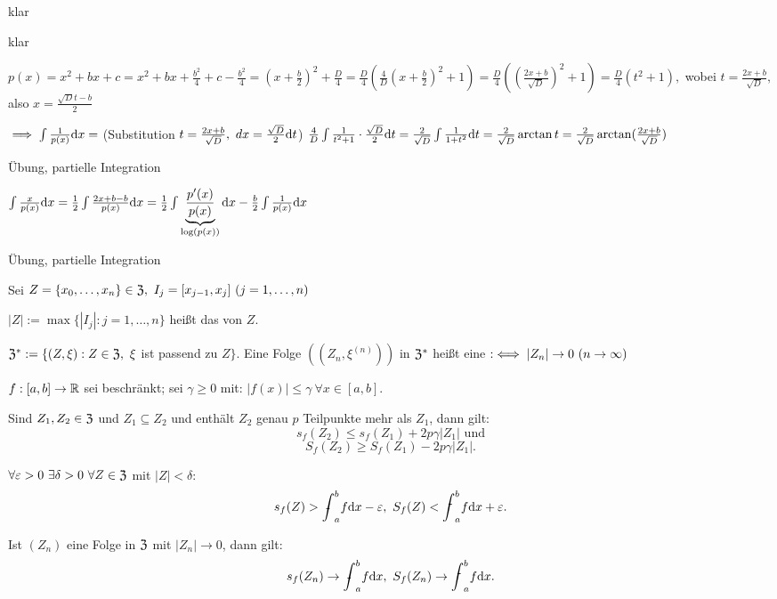 \documentclass[a4paper,oneside,DIV15,BCOR12mm]{scrbook}
\begin{document}
\begin{beweise}
\item klar
\item klar
\item  $p(x) = x^2+bx+c = x^2+bx+\frac{b^2}{4} + c - \frac{b^2}{4} = (x+\frac{b}{2})^2 + \frac{D}{4} = \frac{D}{4}(\frac{4}{D}(x+\frac{b}{2})^2 + 1) = \frac{D}{4}((\frac{2x+b}{\sqrt{D}})^2 + 1)= \frac{D}{4}(t^2+1),$ wobei $t = \frac{2x+b}{\sqrt{D}},$ also $x = \frac{\sqrt{D}t - b}{2}$

$\implies \int\frac{1}{p(x)}\text{d}x =$ (Substitution $t=\frac{2x+b}{\sqrt{D}},\  dx=\frac{\sqrt{D}}{2}\text{d}t$) $\frac{4}{D} \int\frac{1}{t^2+1} \cdot \frac{\sqrt{D}}{2}\text{d}t = \frac{2}{\sqrt{D}} \int\frac{1}{1+t^2}\text{d}t = \frac{2}{\sqrt{D}} \arctan t = \frac{2}{\sqrt{D}} \arctan(\frac{2x+b}{\sqrt{D}})$

\item Übung, partielle Integration
\item $\int\frac{x}{p(x)}\text{d}x = \frac{1}{2} \int\frac{2x+b-b}{p(x)}\text{d}x = \frac{1}{2}\int \underbrace{\frac{p'(x)}{p(x)}}_{\log(p(x))}\text{d}x - \frac{b}{2} \int\frac{1}{p(x)}\text{d}x$

\item Übung, partielle Integration
\end{beweise}

\begin{definition}
\begin{liste}
\item Sei $Z = \{x_0,\ldots,x_n\} \in \mathfrak{Z},\ I_j = [x_{j-1},x_j]\ (j=1,\ldots,n)$

$|Z| := \max \{|I_j| : j=1,\ldots,n\}$ heißt das  von $Z$.

\item $\mathfrak{Z}^* := \{(Z,\xi) : Z \in \mathfrak{Z},\ \xi$ ist passend zu $Z \}$. Eine Folge $((Z_n,\xi^{(n)}))$ in $\mathfrak{Z}^*$ heißt eine  $:\iff |Z_n| \to 0\ (n \to \infty)$
\end{liste}
\end{definition}

\begin{satz}
$f: [a,b] \to \mathbb{R}$ sei beschränkt; sei $\gamma \ge 0$ mit: $|f(x)| \le \gamma\ \forall x \in [a,b].$
\begin{liste}
\item Sind $Z_1,Z_2 \in \mathfrak{Z}$ und $Z_1 \subseteq Z_2$ und enthält $Z_2$ genau $p$ Teilpunkte mehr als $Z_1$, dann gilt: $$s_f(Z_2) \le s_f(Z_1) + 2p\gamma|Z_1|\text{ und}$$
$$S_f(Z_2) \ge S_f(Z_1) - 2p\gamma|Z_1|.$$

\item $\forall \ep > 0\ \exists \delta > 0\ \forall Z \in \Z$ mit $|Z| < \delta$: $$s_f(Z) > \uintab{f} - \ep,\ S_f(Z) < \ointab{f} + \ep.$$

\item Ist $(Z_n)$ eine Folge in $\mathfrak{Z}$ mit $|Z_n| \to 0$, dann gilt: $$s_f(Z_n) \to \uintab{f},\ S_f(Z_n) \to \ointab{f}.$$
\end{liste}
\end{satz}
\end{document}

